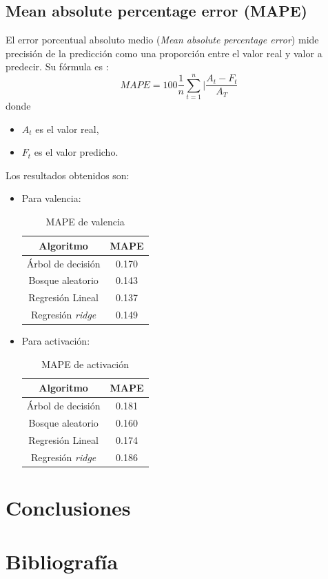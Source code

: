 \documentclass[12pt,a4paper,Spanish]{article}
\begin{document}
\subsection{Mean absolute percentage error (MAPE)}
El error porcentual absoluto medio (\textit{Mean absolute percentage error}) mide precisión de la predicción como una proporción entre el valor real y valor a predecir. Su fórmula es \cite{enwiki:1225070385}:
\begin{equation}
	MAPE = 100 \frac{1}{n} \sum_{t=1}^{n} |\frac{A_t - F_t}{A_T} 
\end{equation}
donde
\begin{itemize}
	\item $A_t$ es el valor real,
	\item $F_t$ es el valor predicho.
\end{itemize}
Los resultados obtenidos son:
\begin{itemize}
	\item Para valencia:
	\begin{table}[H]
		\centering
		\caption{MAPE de valencia}
		\begin{tabular}{|c|c|}
			\hline
			\textbf{Algoritmo} & \textbf{MAPE} \\
			\hline
			Árbol de decisión & 0.170 \\
			Bosque aleatorio & 0.143 \\
			Regresión Lineal & 0.137 \\
			Regresión \textit{ridge} & 0.149 \\
			\hline
		\end{tabular}
	\end{table}
	\item Para activación:
	\begin{table}[H]
		\centering
		\caption{MAPE de activación}
		\begin{tabular}{|c|c|}
			\hline
			\textbf{Algoritmo} & \textbf{MAPE} \\
			\hline
			Árbol de decisión & 0.181 \\
			Bosque aleatorio & 0.160 \\
			Regresión Lineal & 0.174 \\
			Regresión \textit{ridge} & 0.186 \\
			\hline
		\end{tabular}
	\end{table}
\end{itemize}











\newpage
\section{Conclusiones}








\newpage
\section{Bibliografía}
\printbibliography
\end{document}
